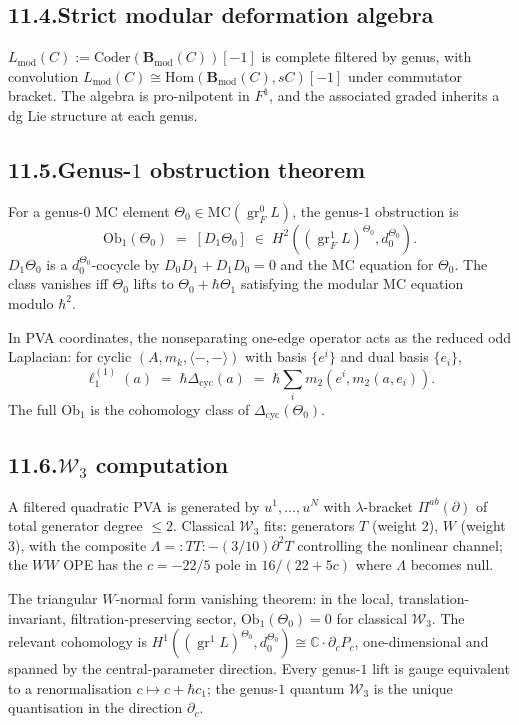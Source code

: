 \documentclass[11pt,reqno]{amsart}
\theoremstyle{definition}
\theoremstyle{remark}
\providecommand{\cW}{\mathcal{W}}
\providecommand{\MC}{\mathrm{MC}}
\providecommand{\Hom}{\mathrm{Hom}}
\providecommand{\bC}{\mathbb{C}}
\providecommand{\mod}{\mathrm{mod}}
\providecommand{\Coder}{\mathrm{Coder}}
\providecommand{\Ob}{\mathrm{Ob}}
\DeclareMathOperator{\gr}{gr}
\numberwithin{equation}{section}
\begin{document}
\subsection*{11.4.\enspace Strict modular deformation algebra}

$L_{\mod}(C) := \Coder(\mathbf B_{\mod}(C))[-1]$ is complete
filtered by genus, with convolution
$L_{\mod}(C) \cong \Hom(\mathbf B_{\mod}(C), sC)[-1]$ under
commutator bracket. The algebra is pro-nilpotent in
$F^1$, and the associated graded inherits a dg Lie structure
at each genus.

\subsection*{11.5.\enspace Genus-$1$ obstruction theorem}

For a genus-$0$ MC element
$\Theta_0 \in \MC(\gr_F^0 L)$, the genus-$1$ obstruction is
\[
\Ob_1(\Theta_0)
\;=\;
[D_1 \Theta_0]
\;\in\;
H^2((\gr_F^1 L)^{\Theta_0}, d_0^{\Theta_0}).
\]
$D_1\Theta_0$ is a $d_0^{\Theta_0}$-cocycle by
$D_0 D_1 + D_1 D_0 = 0$ and the MC equation for $\Theta_0$.
The class vanishes iff $\Theta_0$ lifts to
$\Theta_0 + \hbar\Theta_1$ satisfying the modular MC equation
modulo $\hbar^2$.

In PVA coordinates, the nonseparating one-edge operator acts
as the reduced odd Laplacian: for cyclic $(A, m_k, \langle-,-\rangle)$
with basis $\{e^i\}$ and dual basis $\{e_i\}$,
\[
\ell_1^{(1)}(a)
\;=\;
\hbar\Delta_{\mathrm{cyc}}(a)
\;=\;
\hbar\sum_i m_2(e^i, m_2(a, e_i)).
\]
The full $\Ob_1$ is the cohomology class of
$\Delta_{\mathrm{cyc}}(\Theta_0)$.

\subsection*{11.6.\enspace $\cW_3$ computation}

A filtered quadratic PVA is generated by $u^1, \ldots, u^N$ with
$\lambda$-bracket $\Pi^{ab}(\partial)$ of total generator degree
$\le 2$. Classical $\cW_3$ fits: generators $T$ (weight $2$),
$W$ (weight $3$), with the composite
$\Lambda = :TT: - (3/10)\partial^2 T$ controlling the nonlinear
channel; the $WW$ OPE has the $c = -22/5$ pole in
$16/(22 + 5c)$ where $\Lambda$ becomes null.

The triangular $W$-normal form vanishing theorem: in the local,
translation-invariant, filtration-preserving sector,
$\Ob_1(\Theta_0) = 0$ for classical $\cW_3$. The relevant
cohomology is
$H^1((\gr^1 L)^{\Theta_0}, d_0^{\Theta_0})
\cong \bC\cdot\partial_c P_c$,
one-dimensional and spanned by the central-parameter direction.
Every genus-$1$ lift is gauge equivalent to a renormalisation
$c \mapsto c + \hbar c_1$; the genus-$1$ quantum $\cW_3$ is the
unique quantisation in the direction $\partial_c$.
\end{document}
